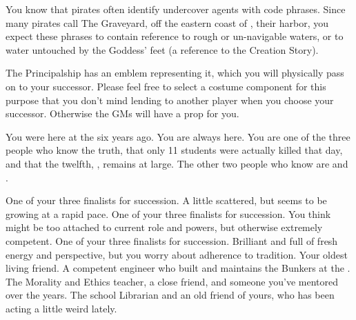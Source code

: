 \documentclass[char]{GL2020}
\begin{document}
\begin{itemz}[Notes]
    \item You know that pirates often identify undercover agents with code phrases. Since many pirates call The Graveyard, off the eastern coast of \pEarth{}, their harbor, you expect these phrases to contain reference to rough or un-navigable waters, or to water untouched by the Goddess' feet (a reference to the \pShippie{} Creation Story).
    \item The Principalship has an emblem representing it, which you will physically pass on to your successor. Please feel free to select a costume component for this purpose that you don't mind lending to another player when you choose your successor. Otherwise the GMs will have a prop for you.
    \item You were here at the \pSchool{} six years ago. You are always here. You are one of the three people who know the truth, that only 11 students were actually killed that day, and that the twelfth, \cKidScientist{\full}, remains at large. The other two people who know are \cDiplomat{\full} and \cMusic{\full}.

\end{itemz}
\begin{contacts}
    \contact{\cMusic{}} One of your three finalists for succession. A little scattered, but seems to be growing at a rapid pace.
    \contact{\cBeetle{}} One of your three finalists for succession. You think \cBeetle{\they} might be too attached to \cBeetle{\their} current role and powers, but \cBeetle{\theyare} otherwise extremely competent.
    \contact{\cChupSecond{}} One of your three finalists for succession. Brilliant and full of fresh energy and perspective, but you worry about \cChupSecond{\their} adherence to tradition. 
    \contact{\cBunker{}} Your oldest living friend. A competent engineer who built and maintains the Bunkers at the \pSc{}.
    \contact{\cEthics{}} The Morality and Ethics teacher, a close friend, and someone you've mentored over the years.
    \contact{\cLibrarian{}} The school Librarian and an old friend of yours, who has been acting a little weird lately. 
\end{contacts}
\end{document}
